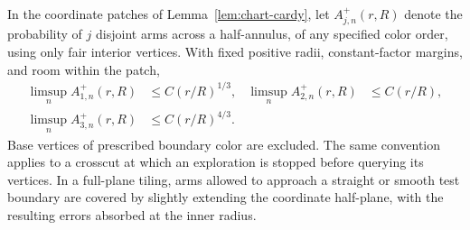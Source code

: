 \begin{lemma}\label{lem:boundary-arms}
In the coordinate patches of Lemma~\ref{lem:chart-cardy}, let
$A_{j,n}^+(r,R)$ denote the probability of $j$ disjoint arms
across a half-annulus, of any specified color order, using
only fair interior vertices.  With fixed positive radii,
constant-factor margins, and room within the patch,
\begin{equation}\label{eq:boundary-arms}
 \begin{aligned}
 \limsup_n A_{1,n}^+(r,R)&\le C(r/R)^{1/3},&
 \limsup_n A_{2,n}^+(r,R)&\le C(r/R),\\
 \limsup_n A_{3,n}^+(r,R)&\le C(r/R)^{4/3}.&&
 \end{aligned}
\end{equation}
Base vertices of prescribed boundary color are excluded.  The
same convention applies to a crosscut at which an exploration
is stopped before querying its vertices.  In a full-plane
tiling, arms allowed to approach a straight or smooth test
boundary are covered by slightly extending the coordinate
half-plane, with the resulting errors absorbed at the inner
radius.
\end{lemma}

